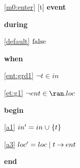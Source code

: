 \noindent \ref{m0:enter} [t] \textbf{event}
\begin{block}
\item \textbf{during}
\begin{block}
\item[ \eqref{default} ]$\text{false}$ %
\end{block}
\item \textbf{when}
\begin{block}
\item[ \eqref{ent:grd1} ]$\neg t \in in $ %
\item[ \eqref{et:g1} ]$\neg ent \in \ran.loc $ %
\end{block}
\item \textbf{begin}
\begin{block}
\item[ \eqref{a1} ]$in' = in \mathbin{\mkern1mu\cup\mkern1mu} \{ t \} $ %
\item[ \eqref{a3} ]$loc' = loc \; | \; t \mathbin\rightarrow ent $ %
\end{block}
\item \textbf{end} \\
\end{block}
